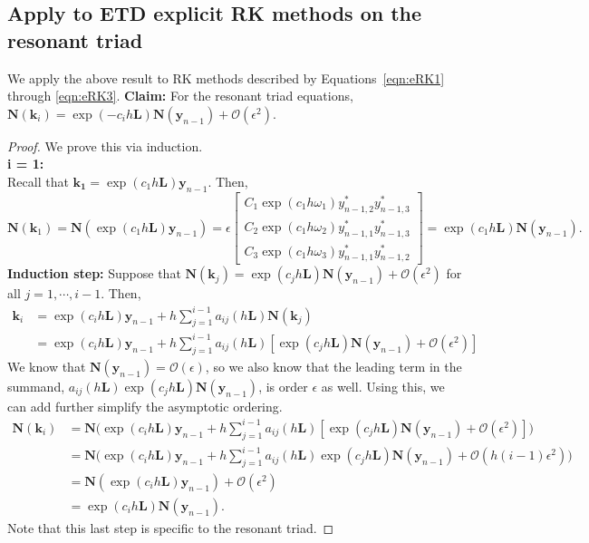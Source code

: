 \documentclass{article}
\newcommand{\eps}{\epsilon}
\newcommand{\bb}[1]{\mathbf{#1}}
\theoremstyle{definition}
\begin{document}
\subsection{Apply to ETD explicit RK methods on the resonant triad}
We apply the above result to RK methods described by Equations~\ref{eqn:eRK1} through \ref{eqn:eRK3}.
\textbf{Claim: }For the resonant triad equations, $\bb{N}(\bb{k}_i) =  \exp(-c_ih\bb{L})\bb{N}(\bb{y}_{n-1})+\mathcal{O}(\eps^2)$.
\begin{proof}
	We prove this via induction. \\
	\textbf{i = 1:}\\
	 Recall that  $\bb{k_1} = \exp(c_1h\bb{L})\bb{y}_{n-1}$. 
	Then, \[\bb{N}(\bb{k}_1) = \bb{N}(\exp(c_1h\bb{L})\bb{y}_{n-1}) = \eps \begin{bmatrix}
	C_1\exp(c_1h\omega_1)y_{n-1,2}^*y_{n-1,3}^* \\
	C_2\exp(c_1h\omega_2)y_{n-1,1}^*y_{n-1,3}^*\\
	C_3\exp(c_1h\omega_3)y_{n-1,1}^*y_{n-1,2}^*
	\end{bmatrix} = \exp(c_1h\bb{L})\bb{N}(\bb{y}_{n-1}).\]
	\textbf{Induction step: }Suppose that $\bb{N}(\bb{k}_{j}) = \exp(c_{j}h\bb{L})\bb{N}(\bb{y}_{n-1})+\mathcal{O}(\eps^2)$ for all $j = 1, \cdots, i-1$.
	Then, 
	\begin{align*}
	\bb{k}_i &= \exp(c_i h \bb{L})\bb{y}_{n-1} + h\sum_{j = 1}^{i-1}a_{ij}(h\bb{L})\bb{N}(\bb{k}_j) \\ 
	&= \exp(c_i h \bb{L})\bb{y}_{n-1} + h\sum_{j = 1}^{i-1}a_{ij}(h\bb{L})\left[\exp(c_jh\bb{L})\bb{N}(\bb{y}_{n-1}) + \mathcal{O}(\eps^2)\right]
	\end{align*}
	We know that $\bb{N}(\bb{y}_{n-1}) = \mathcal{O}(\eps)$, so we also know that the leading term in the summand, $a_{ij}(h\bb{L})\exp(c_jh\bb{L})\bb{N}(\bb{y}_{n-1})$, is order $\eps$ as well.
	Using this, we can add further simplify the asymptotic ordering.
	\begin{align*}
	\bb{N}(\bb{k}_i) &= \bb{N}\bigg(\exp(c_i h \bb{L})\bb{y}_{n-1} + h\sum_{j = 1}^{i-1}a_{ij}(h\bb{L})\left[\exp(c_jh\bb{L})\bb{N}(\bb{y}_{n-1}) + \mathcal{O}(\eps^2)\right]\bigg) \\
	&= \bb{N}\bigg(\exp(c_i h \bb{L})\bb{y}_{n-1} + h\sum_{j = 1}^{i-1}a_{ij}(h\bb{L})\exp(c_jh\bb{L})\bb{N}(\bb{y}_{n-1}) +\mathcal{O}(h(i-1)\eps^2)\bigg) \\
	&= \bb{N}(\exp(c_ih\bb{L})\bb{y}_{n-1}) + \mathcal{O}(\eps^2)\\
	&= \exp(c_ih\bb{L})\bb{N}(\bb{y}_{n-1}).
	\end{align*}
	Note that this last step is specific to the resonant triad. 
\end{proof}
\end{document}
